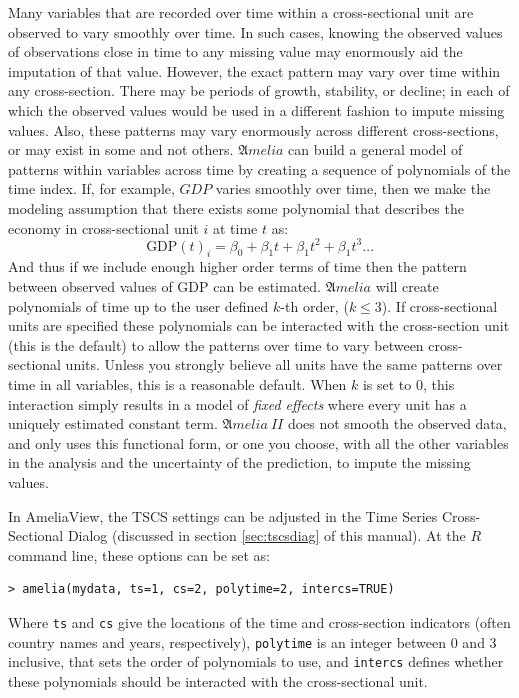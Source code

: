 \documentclass[12pt,titlepage]{article}
\newcommand{\AmeliaII}{\ensuremath{\mathfrak Amelia~II} }
\begin{document}
Many variables that are recorded over time within a cross-sectional
unit are observed to vary smoothly over time.  In such cases, knowing
the observed values of observations close in time to any missing value
may enormously aid the imputation of that value.  However, the exact
pattern may vary over time within any cross-section.  There may be
periods of growth, stability, or decline; in each of which the
observed values would be used in a different fashion to impute missing
values.  Also, these patterns may vary enormously across different
cross-sections, or may exist in some and not others.  ${\mathfrak
  Amelia}$ can build a general model of patterns within variables
across time by creating a sequence of polynomials of the time index.
If, for example, $GDP$ varies smoothly over time, then we make the
modeling assumption that there exists some polynomial that describes
the economy in cross-sectional unit $i$ at time $t$ as:
\begin{equation}
\textrm{GDP}(t)_i = \beta_0 + \beta_1 t + \beta_1 t^2 + \beta_1 t^3 \ldots
\end{equation}
And thus if we include enough higher order terms of time then the
pattern between observed values of GDP can be estimated.  ${\mathfrak
  Amelia}$ will create polynomials of time up to the user defined
$k$-th order, ($k\leq3$).  If cross-sectional units are specified
these polynomials can be interacted with the cross-section unit (this
is the default) to allow the patterns over time to vary between
cross-sectional units.  Unless you strongly believe all units have the
same patterns over time in all variables, this is a reasonable
default.  When $k$ is set to 0, this interaction simply results in a
model of \emph{fixed effects} where every unit has a uniquely
estimated constant term.  \AmeliaII does not smooth the observed data,
and only uses this functional form, or one you choose, with all the
other variables in the analysis and the uncertainty of the prediction,
to impute the missing values.

In AmeliaView, the TSCS settings can be adjusted in the Time Series
Cross-Sectional Dialog (discussed in section \ref{sec:tscsdiag} of
this manual).  At the $R$ command line, these options can be set as:

\begin{verbatim}
> amelia(mydata, ts=1, cs=2, polytime=2, intercs=TRUE)
\end{verbatim} 

Where \texttt{ts} and \texttt{cs} give the locations of the time and
cross-section indicators (often country names and years,
respectively), \texttt{polytime} is an integer between 0 and 3
inclusive, that sets the order of polynomials to use, and
\texttt{intercs} defines whether these polynomials should be
interacted with the cross-sectional unit.
\end{document}
